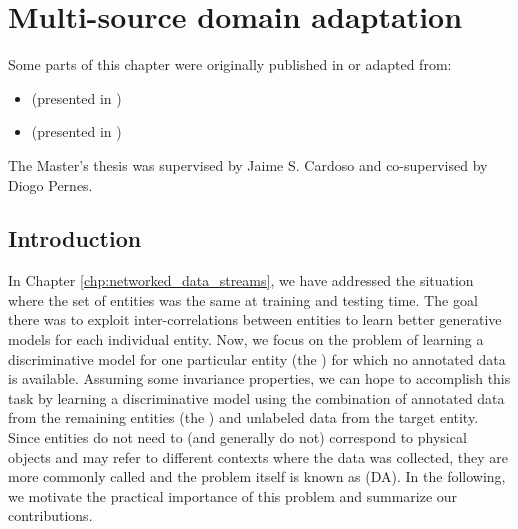
\chapter{Multi-source domain adaptation}


\label{chp:domain_adaptation}


\begin{tcolorbox}
	\small{
		Some parts of this chapter were originally published in or adapted from:
		\begin{itemize}
			\item[] \cite{ThesisFrancisco}  (presented in )
			\item[] \cite{MODAFM}  (presented in )
		\end{itemize}
		
		The Master's thesis \cite{ThesisFrancisco} was supervised by Jaime S. Cardoso and co-supervised by Diogo Pernes.
	}
\end{tcolorbox}

\section{Introduction}
\label{sec:chp3_intro}
In Chapter \ref{chp:networked_data_streams}, we have addressed the situation where the set of entities was the same at training and testing time. The goal there was to exploit inter-correlations between entities to learn better generative models for each individual entity. Now, we focus on the problem of learning a discriminative model for one particular entity (the ) for which no annotated data is available. Assuming some invariance properties, we can hope to accomplish this task by learning a discriminative model using the combination of annotated data from the remaining entities (the ) and unlabeled data from the target entity. Since entities do not need to (and generally do not) correspond to physical objects and may refer to different contexts where the data was collected, they are more commonly called  and the problem itself is known as  (DA). In the following, we motivate the practical importance of this problem and summarize our contributions.

